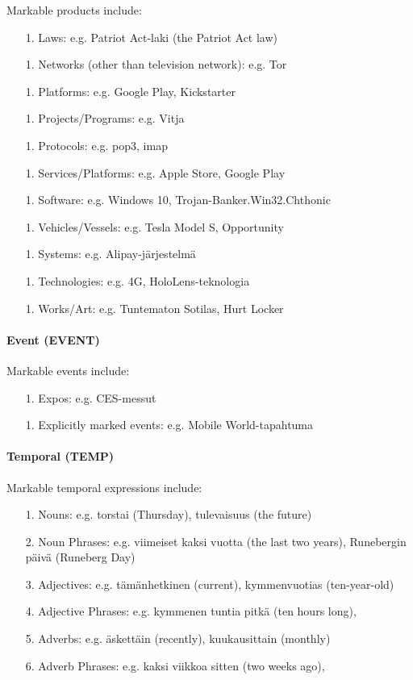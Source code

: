 \documentclass[11pt]{article}
\begin{document}
Markable products include:

\begin{itemize}

\item[1.] Laws: e.g. Patriot Act-laki (the Patriot Act law)
\item[1.] Networks (other than television network): e.g. Tor
\item[1.] Platforms: e.g. Google Play, Kickstarter
\item[1.] Projects/Programs: e.g. Vitja
\item[1.] Protocols: e.g. pop3, imap
\item[1.] Services/Platforms: e.g. Apple Store, Google Play
\item[1.] Software: e.g. Windows 10, Trojan-Banker.Win32.Chthonic
\item[1.] Vehicles/Vessels: e.g. Tesla Model S, Opportunity
\item[1.] Systems: e.g. Alipay-j\"arjestelm\"a
\item[1.] Technologies: e.g. 4G, HoloLens-teknologia
\item[1.] Works/Art: e.g. Tuntematon Sotilas, Hurt Locker
 
\end{itemize}


\paragraph{Event (EVENT)}

Markable events include:

\begin{itemize}

\item[1.] Expos: e.g. CES-messut
\item[1.] Explicitly marked events: e.g. Mobile World-tapahtuma

\end{itemize}


\paragraph{Temporal (TEMP)} Markable temporal expressions include:

\begin{itemize}

\item[1.] Nouns: e.g. torstai (Thursday), tulevaisuus (the future)
\item[2.] Noun Phrases: e.g. viimeiset kaksi vuotta (the last two years),  Runebergin p\"aiv\"a (Runeberg Day)
\item[3.] Adjectives: e.g. t\"am\"anhetkinen (current), kymmenvuotias (ten-year-old) 
\item[4.] Adjective Phrases: e.g. kymmenen tuntia pitk\"a (ten hours long), 
\item[5.] Adverbs: e.g. \"askett\"ain (recently), kuukausittain (monthly)
\item[6.] Adverb Phrases: e.g. kaksi viikkoa sitten (two weeks ago),

\end{itemize}
\end{document}
